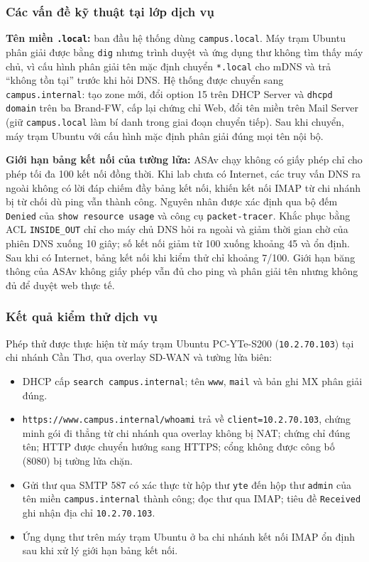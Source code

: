 \subsubsection{Các vấn đề kỹ thuật tại lớp dịch vụ}\label{sec:bai_hoc_dich_vu}

\textbf{Tên miền \texttt{.local}:} ban đầu hệ thống dùng \texttt{campus.local}. Máy trạm Ubuntu phân giải được bằng \texttt{dig} nhưng trình duyệt và ứng dụng thư không tìm thấy máy chủ, vì cấu hình phân giải tên mặc định chuyển \texttt{*.local} cho mDNS và trả ``không tồn tại'' trước khi hỏi DNS. Hệ thống được chuyển sang \texttt{campus.internal}: tạo zone mới, đổi option 15 trên DHCP Server và \texttt{dhcpd domain} trên ba Brand-FW, cấp lại chứng chỉ Web, đổi tên miền trên Mail Server (giữ \texttt{campus.local} làm bí danh trong giai đoạn chuyển tiếp). Sau khi chuyển, máy trạm Ubuntu với cấu hình mặc định phân giải đúng mọi tên nội bộ.

\textbf{Giới hạn bảng kết nối của tường lửa:} ASAv chạy không có giấy phép chỉ cho phép tối đa 100 kết nối đồng thời. Khi lab chưa có Internet, các truy vấn DNS ra ngoài không có lời đáp chiếm đầy bảng kết nối, khiến kết nối IMAP từ chi nhánh bị từ chối dù ping vẫn thành công. Nguyên nhân được xác định qua bộ đếm \texttt{Denied} của \texttt{show resource usage} và công cụ \texttt{packet-tracer}. Khắc phục bằng ACL \texttt{INSIDE\_OUT} chỉ cho máy chủ DNS hỏi ra ngoài và giảm thời gian chờ của phiên DNS xuống 10 giây; số kết nối giảm từ 100 xuống khoảng 45 và ổn định. Sau khi có Internet, bảng kết nối khi kiểm thử chỉ khoảng 7/100. Giới hạn băng thông của ASAv không giấy phép vẫn đủ cho ping và phân giải tên nhưng không đủ để duyệt web thực tế.

\subsubsection{Kết quả kiểm thử dịch vụ}

Phép thử được thực hiện từ máy trạm Ubuntu PC-YTe-S200 (\texttt{10.2.70.103}) tại chi nhánh Cần Thơ, qua overlay SD-WAN và tường lửa biên:
\begin{itemize}
    \item DHCP cấp \texttt{search campus.internal}; tên \texttt{www}, \texttt{mail} và bản ghi MX phân giải đúng.
    \item \texttt{https://www.campus.internal/whoami} trả về \texttt{client=10.2.70.103}, chứng minh gói đi thẳng từ chi nhánh qua overlay không bị NAT; chứng chỉ đúng tên; HTTP được chuyển hướng sang HTTPS; cổng không được công bố (8080) bị tường lửa chặn.
    \item Gửi thư qua SMTP 587 có xác thực từ hộp thư \texttt{yte} đến hộp thư \texttt{admin} của tên miền \texttt{campus.internal} thành công; đọc thư qua IMAP; tiêu đề \texttt{Received} ghi nhận địa chỉ \texttt{10.2.70.103}.
    \item Ứng dụng thư trên máy trạm Ubuntu ở ba chi nhánh kết nối IMAP ổn định sau khi xử lý giới hạn bảng kết nối.
\end{itemize}

